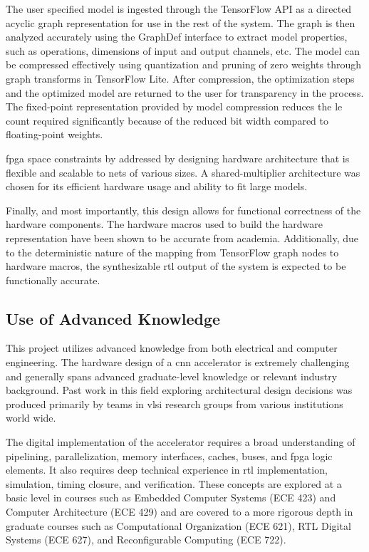 \documentclass{uw-ece-wkrpt}
\begin{document}
The user specified model is ingested through the TensorFlow API as a directed acyclic graph representation for use in the rest of the system. The graph is then analyzed accurately using the GraphDef interface to extract model properties, such as operations, dimensions of input and output channels, etc. The model can be compressed effectively using quantization and pruning of zero weights through graph transforms in TensorFlow Lite. After compression, the optimization steps and the optimized model are returned to the user for transparency in the process. The fixed-point representation provided by model compression reduces the \gls{le} count required significantly because of the reduced bit width compared to floating-point weights.

\gls{fpga} space constraints by addressed by designing hardware architecture that is flexible and scalable to nets of various sizes. A shared-multiplier architecture was chosen for its efficient hardware usage and ability to fit large models.

Finally, and most importantly, this design allows for functional correctness of the hardware components. The hardware macros used to build the hardware representation have been shown to be accurate from academia. Additionally, due to the deterministic nature of the mapping from TensorFlow graph nodes to hardware macros, the synthesizable \gls{rtl} output of the system is expected to be functionally accurate.

\subsection{Use of Advanced Knowledge}

This project utilizes advanced knowledge from both electrical and computer engineering. The hardware design of a \gls{cnn} accelerator is extremely challenging and generally spans advanced graduate-level knowledge or relevant industry background. Past work in this field exploring architectural design decisions was produced primarily by teams in \gls{vlsi} research groups from various institutions world wide.

The digital implementation of the accelerator requires a broad understanding of pipelining, parallelization, memory interfaces, caches, buses, and \gls{fpga} logic elements. It also requires deep technical experience in \gls{rtl} implementation, simulation, timing closure, and verification. These concepts are explored at a basic level in courses such as Embedded Computer Systems (ECE 423) and Computer Architecture (ECE 429) and are covered to a more rigorous depth in graduate courses such as Computational Organization (ECE 621), RTL Digital Systems (ECE 627), and Reconfigurable Computing (ECE 722).
\end{document}
